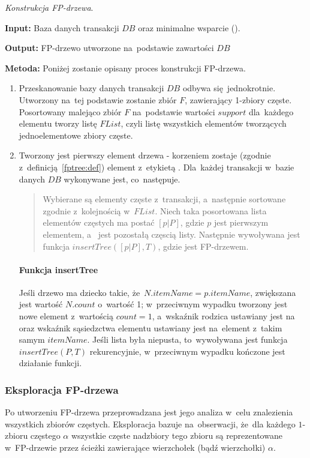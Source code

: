 \begin{alg}\label{alg:fptre:econstruction}
	\emph{Konstrukcja FP-drzewa}.

	\textbf{Input:} Baza danych transakcji $DB$ oraz minimalne wsparcie ().

	\textbf{Output:} FP-drzewo utworzone na~podstawie zawartości $DB$

	\textbf{Metoda:} Poniżej zostanie opisany proces konstrukcji FP-drzewa.

	\begin{enumerate}
		\item Przeskanowanie bazy danych transakcji $DB$ odbywa się~jednokrotnie. Utworzony na~tej podstawie zostanie zbiór $F$, zawierający 1-zbiory częste. Posortowany malejąco zbiór $F$ na~podstawie wartości $support$ dla~każdego elementu tworzy listę $FList$, czyli listę wszystkich elementów tworzących jednoelementowe zbiory częste.
		\item Tworzony jest pierwszy element drzewa - korzeniem zostaje (zgodnie z~definicją~\ref{fptree:def}) element z~etykietą . Dla~każdej transakcji w~bazie danych $DB$ wykonywane jest, co~następuje.
		\begin{quote}
			Wybierane są elementy częste z~transakcji, a~następnie sortowane zgodnie z~kolejnością w~$FList$. Niech taka posortowana lista elementów częstych ma postać $[p|P]$, gdzie $p$ jest pierwszym elementem, a~ jest pozostałą częscią listy. Następnie wywoływana jest funkcja $insertTree([p|P], T)$, gdzie  jest FP-drzewem.
		\end{quote}
			\paragraph{Funkcja insertTree} Jeśli drzewo  ma dziecko  takie, że~$N.itemName = p.itemName$, zwiększana jest wartość $N.count$ o~wartość 1; w~przeciwnym wypadku tworzony jest nowe element  z~wartością $count = 1$, a~wskaźnik rodzica ustawiany jest na~ oraz wskaźnik sąsiedzctwa elementu ustawiany jest na~element z~takim samym $itemName$. Jeśli lista  była niepusta, to~wywoływana jest funkcja $insertTree(P, T)$ rekurencyjnie, w~przeciwnym wypadku kończone jest działanie funkcji.
	\end{enumerate}
\end{alg}

\subsubsection{Eksploracja FP-drzewa}
Po utworzeniu FP-drzewa przeprowadzana jest jego analiza w~celu znalezienia wszystkich zbiorów częstych. Eksploracja bazuje na~obserwacji, że~dla każdego $1$-zbioru częstego $\alpha$ wszystkie częste nadzbiory tego zbioru są reprezentowane w~FP-drzewie przez ścieżki zawierające wierzchołek (bądź wierzchołki) $\alpha$.

